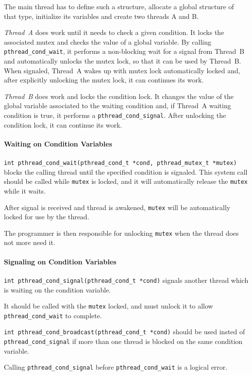 The main thread has to define such a structure, allocate a global structure of that type, initialize its variables and create two threads A and B.

\textit{Thread~A} does work until it needs to check a given condition. It locks the associated mutex and checks the value of a global variable. By calling \texttt{pthread\_cond\_wait}, it performs a non-blocking wait for a signal from Thread~B and automatically unlocks the mutex lock, so that it can be used by Thread~B. When signaled, Thread~A wakes up with mutex lock automatically locked and, after explicitly unlocking the mutex lock, it can continues its work.

\textit{Thread~B} does work and locks the condition lock. It changes the value of the global variable associated to the waiting condition and, if Thread~A waiting condition is true, it performs a \texttt{pthread\_cond\_signal}. After unlocking the condition lock, it can continue its work.

\paragraph{Waiting on Condition Variables}
\begin{description}
\item \texttt{int pthread\_cond\_wait(pthread\_cond\_t *cond, \newline pthread\_mutex\_t *mutex)} blocks the calling thread until the specified condition is signaled. This system call should be called while \texttt{mutex} is locked, and it will automatically release the \texttt{mutex} while it waits.

After signal is received and thread is awakened, \texttt{mutex} will be automatically locked for use by the thread.

The programmer is then responsible for unlocking \texttt{mutex} when the thread does not more need it.
\end{description}

\paragraph{Signaling on Condition Variables}
\begin{description}
\item \texttt{int pthread\_cond\_signal(pthread\_cond\_t *cond)} signals another thread which is waiting on the condition variable.

It should be called with the \texttt{mutex} locked, and must unlock it to allow \texttt{pthread\_cond\_wait} to complete.

\item \texttt{int pthread\_cond\_broadcast(pthread\_cond\_t *cond)} should be used insted of \texttt{pthread\_cond\_signal} if more than one thread is blocked on the same condition variable.
\end{description}
Calling \texttt{pthread\_cond\_signal} before \texttt{pthread\_cond\_wait} is a logical error.

